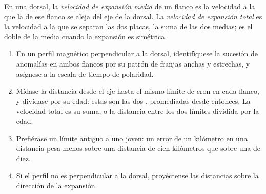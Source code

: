 \begin{omfigure}
\par{}
\label{fig:b1:plate-kinematics:stripes}
\end{omfigure}

\begin{definition}\label{def:b1:plate-kinematics:spreading-rate}
En una dorsal, la \emph{velocidad de expansión media} de un flanco es la velocidad a la que la
 de ese flanco se aleja del eje de la dorsal. La \emph{velocidad de expansión total} es la
velocidad a la que se separan las dos placas, la suma de las dos medias; es el doble de la media cuando la expansión es simétrica.
\end{definition}

\begin{method}\label{met:b1:plate-kinematics:rate}
\begin{enumerate}
  \item En un perfil magnético perpendicular a la dorsal, identifíquese la sucesión de anomalías en ambos flancos por su patrón de
        franjas anchas y estrechas, y asígnese a la escala de tiempo de polaridad.
  \item Mídase la distancia desde el eje hasta el mismo límite de cron en cada flanco, y divídase por su edad: estas son las dos
        , promediadas desde entonces. La velocidad total es su suma, o la distancia entre los dos límites
        dividida por la edad.
  \item Prefiérase un límite antiguo a uno joven: un error de un kilómetro en una distancia pesa menos sobre una distancia de cien
        kilómetros que sobre una de diez.
  \item Si el perfil no es perpendicular a la dorsal, proyéctense las distancias sobre la dirección de la expansión.
\end{enumerate}
\end{method}

